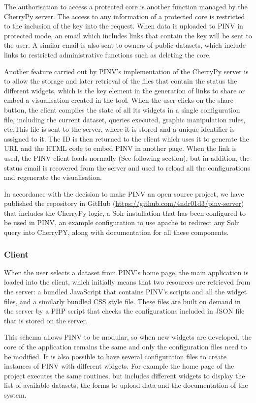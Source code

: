 The authorisation to access a protected core is another function managed by the CherryPy server. The access to any information of a protected core is restricted to the inclusion of the key into the request. When data is uploaded to PINV in protected mode, an email which includes links that contain the key will be sent to the user. A similar email is also sent to owners of public datasets, which include links to restricted administrative functions such as deleting the core.

Another feature carried out by PINV's implementation of the CherryPy server is to allow the storage and later retrieval of the files that contain the status the different widgets, which is the key element in the generation of links to share or embed a visualisation created in the tool. When the user clicks on the share button, the client compiles the state of all its widgets in a single configuration file, including the current dataset, queries executed, graphic manipulation rules, etc.This file is sent to the server, where it is stored and a unique identifier is assigned to it. The ID is then returned to the client which uses it to generate the URL and the HTML code to embed PINV in another page. When the link is used, the PINV client loads normally (See following section), but in addition, the status email is recovered from the server and used to reload all the configurations and regenerate the visualisation.

In accordance with the decision to make PINV an open source project, we have published the repository in GitHub (\url{https://github.com/4ndr01d3/pinv-server}) that includes the CherryPy logic, a Solr installation that has been configured to be used in PINV, an example configuration to use apache to redirect any Solr query into CherryPY, along with documentation for all these components.

\subsubsection{Client}
When the user selects a dataset from PINV's home page, the main application is loaded into the client, which initially means that two resources are retrieved from the server: a bundled JavaScript that contains PINV's scripts and all the widget files, and a similarly bundled CSS style file. These files are built on demand in the server by a PHP script that checks the configurations included in JSON file that is stored on the server. 

This schema allows PINV to be modular, so when new widgets are developed, the core of the application remains the same and only the configuration files need to be modified. It is also possible to have several configuration files to create instances of PINV with different widgets. For example the home page of the project executes the same routines, but includes different widgets to display the list of available datasets, the forms to upload data and the documentation of the system.

